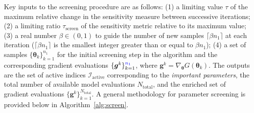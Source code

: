 Key inputs to the screening procedure
are as follows: (1) 
a limiting value $\tau$ of the maximum relative change in the sensitivity
measure between successive iterations; (2) 
a limiting ratio $\tau_\text{screen}$ of the sensitivity metric 
relative to its maximum value;
(3) a real number $\beta \in (0, 1)$ to 
guide the number of new samples $\lceil \beta n_1 \rceil$ 
at each iteration ($\lceil \beta n_1
\rceil$ 
is the smallest integer greater than or equal to $\beta n_1$); 
(4) a set of samples $\{ \bm{\theta}_k \}_{k = 1}^{n_1}$ 
for the initial screening step in
the algorithm and the corresponding gradient evaluations 
$\{ \bm{g}^k \}_{k=1}^{{\color{blue}{n_1}}}$, where
$\bm{g}^k = \nabla_{\bm{\theta}} G(\bm{\theta}_k)$. 
The outputs are the set of active
indices $\mathcal{I}_\text{active}$ corresponding to the 
\emph{important parameters}, the total number of available model 
evaluations $N_\text{total}$, and the enriched set of gradient evaluations 
$\{ \bm{g}^k\}_{k=1}^{N_\text{total}}$. 
A general methodology for parameter screening is provided below in
Algorithm~\ref{alg:screen}.

